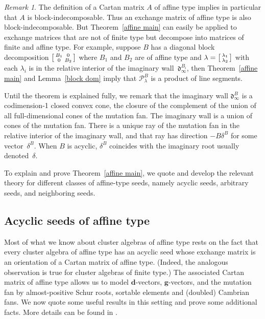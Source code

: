 \documentclass{amsart}
\theoremstyle{definition}
\theoremstyle{remark}
\newtheorem{remark}[proposition]{Remark}
\numberwithin{equation}{section}
\newcommand{\0}{{\mathbf{0}}}
\newcommand{\Cone}{\mathrm{Cone}}
\newcommand{\Proj}{\mathrm{Proj}}
\newcommand{\g}{\mathbf{g}}
\newcommand{\tB}{{\tilde{B}}}
\renewcommand{\P}{\mathcal{P}}
\renewcommand{\d}{{\mathfrak d}}
\newcommand{\dd}{{\mathbf d}}
\begin{document}
\begin{remark}\label{indecomposable}
The definition of a Cartan matrix $A$ of affine type implies in particular that $A$ is block-indecomposable.
Thus an exchange matrix of affine type is also block-indecomposable.
But Theorem~\ref{affine main} can easily be applied to exchange matrices that are not of finite type but decompose into matrices of finite and affine type.
For example, suppose $B$ has a diagonal block decomposition $\begin{bsmallmatrix}B_1&0\\0&B_2\end{bsmallmatrix}$ where $B_1$ and $B_2$ are of affine type and $\lambda=\begin{bsmallmatrix}\lambda_1\\\lambda_2\end{bsmallmatrix}$ with each $\lambda_i$ is in the relative interior of the imaginary wall~$\d^{B_i}_\infty$, then Theorem~\ref{affine main} and Lemma~\ref{block dom} imply that $\P_\lambda^B$ is a product of line segments.

\end{remark}

Until the theorem is explained fully, we remark that the imaginary wall $\d^B_\infty$ is a codimension-1 closed convex cone, the closure of the complement of the union of all full-dimensional cones of the mutation fan.
The imaginary wall is a union of cones of the mutation fan.
There is a unique ray of the mutation fan in the relative interior of the imaginary wall, and that ray has direction $-B\delta^B$ for some vector~$\delta^B$.
When $B$ is acyclic, $\delta^B$ coincides with the imaginary root usually denoted~$\delta$.

To explain and prove Theorem~\ref{affine main}, we quote and develop the relevant theory for different classes of affine-type seeds, namely acyclic seeds, arbitrary seeds, and neighboring seeds.

\subsection{Acyclic seeds of affine type}\label{acyc sec}
Most of what we know about cluster algebras of affine type rests on the fact that every cluster algebra of affine type has an acyclic seed whose exchange matrix is an orientation of a Cartan matrix of affine type.
(Indeed, the analogous observation is true for cluster algebras of finite type.)
The associated Cartan matrix of affine type allows us to model $\dd$-vectors, $\g$-vectors, and the mutation fan by almost-positive Schur roots, sortable elements and (doubled) Cambrian fans.
We now quote some useful results in this setting and prove some additional facts.
More details can be found in \cite{affdenom,framework,afframe,affscat}.
\end{document}
